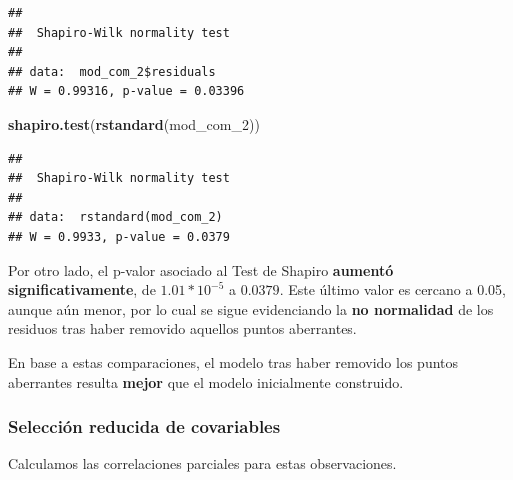 \documentclass[
]{article}
\newenvironment{Shaded}{\begin{snugshade}}{\end{snugshade}}
\newcommand{\FunctionTok}[1]{\textcolor[rgb]{0.13,0.29,0.53}{\textbf{#1}}}
\newcommand{\NormalTok}[1]{#1}
\newcommand{\SpecialCharTok}[1]{\textcolor[rgb]{0.81,0.36,0.00}{\textbf{#1}}}
\begin{document}
\begin{Shaded}
\end{Shaded}

\begin{verbatim}
## 
##  Shapiro-Wilk normality test
## 
## data:  mod_com_2$residuals
## W = 0.99316, p-value = 0.03396
\end{verbatim}

\begin{Shaded}
\begin{Highlighting}[]
\FunctionTok{shapiro.test}\NormalTok{(}\FunctionTok{rstandard}\NormalTok{(mod\_com\_2))}
\end{Highlighting}
\end{Shaded}

\begin{verbatim}
## 
##  Shapiro-Wilk normality test
## 
## data:  rstandard(mod_com_2)
## W = 0.9933, p-value = 0.0379
\end{verbatim}

Por otro lado, el p-valor asociado al Test de Shapiro \textbf{aumentó
significativamente}, de \(1.01*10^{-5}\) a \(0.0379\). Este último valor
es cercano a 0.05, aunque aún menor, por lo cual se sigue evidenciando
la \textbf{no normalidad} de los residuos tras haber removido aquellos
puntos aberrantes.

En base a estas comparaciones, el modelo tras haber removido los puntos
aberrantes resulta \textbf{mejor} que el modelo inicialmente construido.

\subsubsection{Selección reducida de
covariables}\label{selecciuxf3n-reducida-de-covariables}

Calculamos las correlaciones parciales para estas observaciones.
\end{document}
